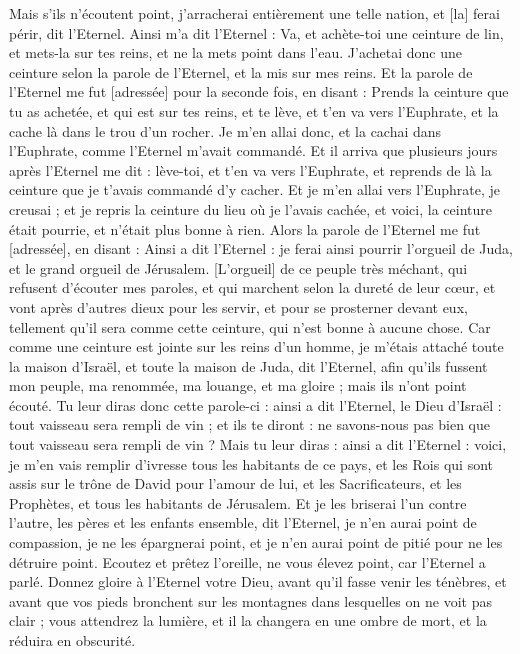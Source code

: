 \begin{multicols}{2}
Mais s'ils n'écoutent point, j'arracherai entièrement une telle nation, et [la] ferai périr, dit l'Eternel.
\VerseOne{}Ainsi m'a dit l'Eternel : Va, et achète-toi une ceinture de lin, et mets-la sur tes reins, et ne la mets point dans l'eau.
J'achetai donc une ceinture selon la parole de l'Eternel, et la mis sur mes reins.
Et la parole de l'Eternel me fut [adressée] pour la seconde fois, en disant :
Prends la ceinture que tu as achetée, et qui est sur tes reins, et te lève, et t'en va vers l'Euphrate, et la cache là dans le trou d'un rocher.
Je m'en allai donc, et la cachai dans l'Euphrate, comme l'Eternel m'avait commandé.
Et il arriva que plusieurs jours après l'Eternel me dit : lève-toi, et t'en va vers l'Euphrate, et reprends de là la ceinture que je t'avais commandé d'y cacher.
Et je m'en allai vers l'Euphrate, je creusai ; et je repris la ceinture du lieu où je l'avais cachée, et voici, la ceinture était pourrie, et n'était plus bonne à rien.
Alors la parole de l'Eternel me fut [adressée], en disant :
Ainsi a dit l'Eternel : je ferai ainsi pourrir l'orgueil de Juda, et le grand orgueil de Jérusalem.
[L'orgueil] de ce peuple très méchant, qui refusent d'écouter mes paroles, et qui marchent selon la dureté de leur cœur, et vont après d'autres dieux pour les servir, et pour se prosterner devant eux, tellement qu'il sera comme cette ceinture, qui n'est bonne à aucune chose.
Car comme une ceinture est jointe sur les reins d'un homme, je m'étais attaché toute la maison d'Israël, et toute la maison de Juda, dit l'Eternel, afin qu'ils fussent mon peuple, ma renommée, ma louange, et ma gloire ; mais ils n'ont point écouté.
Tu leur diras donc cette parole-ci : ainsi a dit l'Eternel, le Dieu d'Israël : tout vaisseau sera rempli de vin ; et ils te diront : ne savons-nous pas bien que tout vaisseau sera rempli de vin ?
Mais tu leur diras : ainsi a dit l'Eternel : voici, je m'en vais remplir d'ivresse tous les habitants de ce pays, et les Rois qui sont assis sur le trône de David pour l'amour de lui, et les Sacrificateurs, et les Prophètes, et tous les habitants de Jérusalem.
Et je les briserai l'un contre l'autre, les pères et les enfants ensemble, dit l'Eternel, je n'en aurai point de compassion, je ne les épargnerai point, et je n'en aurai point de pitié pour ne les détruire point.
Ecoutez et prêtez l'oreille, ne vous élevez point, car l'Eternel a parlé.
Donnez gloire à l'Eternel votre Dieu, avant qu'il fasse venir les ténèbres, et avant que vos pieds bronchent sur les montagnes dans lesquelles on ne voit pas clair ; vous attendrez la lumière, et il la changera en une ombre de mort, et la réduira en obscurité.

\end{multicols}
